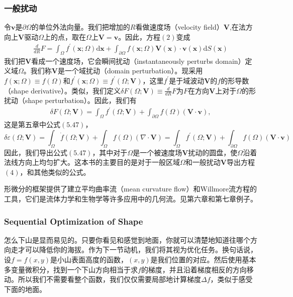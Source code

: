 \documentclass[12pt,a4paper]{article}
\numberwithin{equation}{section}
\begin{document}
\subsubsection{一般扰动}
令$\boldsymbol{v}$是$\partial \Omega$的单位外法向量。我们把增加的$R$看做速度场（velocity field）$\mathbf{V}$,在法方向上$\mathbf{V}$驱动$\Omega$上的点，取在$\Omega$上$\mathbf{V}=\boldsymbol{v}$。因此，方程$(2)$变成
\begin{gather}
\frac{d}{dR}F=\int_{\Omega}f^{'}(\mathbf{x};\Omega)\mathrm{d}\mathbf{x} + \int_{\partial \Omega}f(\mathbf{x};\Omega)\mathbf{V}(\mathbf{x})\cdot \boldsymbol{v}(\mathbf{x})\mathrm{d}S(\mathbf{x})
\end{gather}
我们把$\mathbf{V}$看成一个速度场，它会瞬间扰动（instantaneously perturbs domain）定义域$\Omega$。我们称$\mathbf{V}$是一个域扰动（domain perturbation）。现采用$f(\mathbf{x};\Omega)\equiv f(\Omega)$和$f^{'}(\mathbf{x};\Omega)\equiv f^{'}(\Omega;\mathbf{V})$，这里$f^{'}$是于域波动$\mathbf{V}$的$f$的形导数（shape derivative）。类似，我们定义$\delta F(\Omega;\mathbf{V})\equiv \frac{d}{dR}F$为$F$在方向$\mathbf{V}$上对于$\Omega$的形扰动（shape perturbation）。因此，我们有
\begin{gather}
\delta F(\Omega;\mathbf{V})=\int_{\Omega}f^{'}(\Omega;\mathbf{V})+\int_{\partial \Omega}f(\Omega)(\mathbf{V} \cdot \boldsymbol{v}),
\end{gather}
这是第五章中公式$(5.47)$，
$$\delta \varepsilon (\Omega;\mathbf{V})=\int_{\Omega}\dot{f}(\Omega;\mathbf{V})+\int_{\Omega}f(\Omega)(\nabla \cdot \mathbf{V})=\int_{\Omega}f^{'}(\Omega;\mathbf{V})+\int_{\partial \Omega}f(\Omega)(\mathbf{V} \cdot \boldsymbol{v})$$因此，我们导出公式$(5.47)$，其中对于$\Omega$是一个被速度场$\mathbf{V}$扰动的圆盘，使$\Omega$沿着法线方向上均匀扩大。这本书的主要目的是对于一般区域$\Omega$和一般扰动$\mathbf{V}$导出方程$(4)$，和其他类似的公式。

形微分的框架提供了建立平均曲率流（mean curvature flow）和Willmore流方程的工具，它们是流体力学和生物学等许多应用中的几何流。见第六章和第七章例子。

\subsubsection{Sequential Optimization of Shape}
怎么下山是显而易见的。只要你看见和感觉到地面，你就可以清楚地知道往哪个方向走才可以降低你的海拔。作为下一节动机，我们将其视为优化任务。换句话说，设$f=f(x,y)$是小山表面高度的函数，$(x,y)$是我们位置的对应。然后使用基本多变量微积分，找到一个下山方向相当于求$f$的梯度，并且沿着梯度相反的方向移动。所以我们不需要看整个函数，我们仅仅需要局部地计算梯度$\Delta f$，类似于感受下面的地面。
\end{document}
